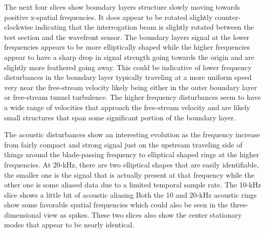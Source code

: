 The next four slices show boundary layers structure slowly moving towards positive x-spatial frequencies.
It does appear to be rotated slightly counter-clockwise indicating that the interrogation beam is slightly rotated between the test section and the wavefront sensor.
The boundary layers signal at the lower frequencies appears to be more elliptically shaped while the higher frequencies appear to have a sharp drop in signal strength going towards the origin and are slightly more feathered going away.
This could be indicative of lower frequency disturbances in the boundary layer typically traveling at a more uniform speed very near the free-stream velocity likely being either in the outer boundary layer or free-stream tunnel turbulence.
The higher frequency disturbances seem to have a wide range of velocities that approach the free-stream velocity and are likely small structures that span some significant portion of the boundary layer.

The acoustic disturbances show an interesting evolution as the frequency increase from fairly compact and strong signal just on the upstream traveling side of things around the blade-passing frequency to elliptical shaped rings at the higher frequencies.
At 20-kHz, there are two elliptical shapes that are easily identifiable, the smaller one is the signal that is actually present at that frequency while the other one is some aliased data due to a limited temporal sample rate.
The 10-kHz slice shows a little bit of acoustic aliasing
Both the 10 and 20-kHz acoustic rings show some favorable spatial frequencies which could also be seen in the three-dimensional view as spikes.
These two slices also show the center stationary modes that appear to be nearly identical.

